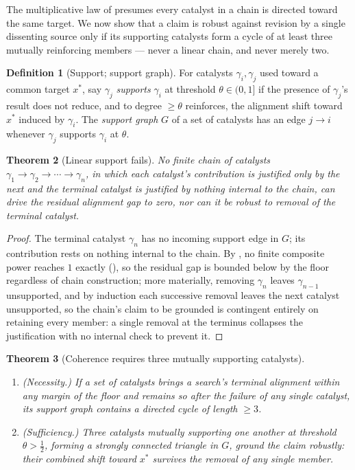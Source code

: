 \documentclass[11pt,twocolumn,a4paper]{article}
\theoremstyle{thmstyle}
\newtheorem{theorem}{Theorem}[section]
\theoremstyle{definition}
\newtheorem{definition}[theorem]{Definition}
\theoremstyle{remark}
\begin{document}
The multiplicative law of  presumes every
catalyst in a chain is directed toward the same target. We now show that a
claim is robust against revision by a single dissenting source only if its
supporting catalysts form a cycle of at least three mutually reinforcing
members --- never a linear chain, and never merely two.

\begin{definition}[Support; support graph]
\label{def:support}
For catalysts $\gamma_i,\gamma_j$ used toward a common target $x^{\ast}$,
say $\gamma_j$ \emph{supports} $\gamma_i$ at threshold $\theta\in(0,1]$ if
the presence of $\gamma_j$'s result does not reduce, and to degree
$\ge\theta$ reinforces, the alignment shift toward $x^{\ast}$ induced by
$\gamma_i$. The \emph{support graph} $G$ of a set of catalysts has an
edge $j\to i$ whenever $\gamma_j$ supports $\gamma_i$ at $\theta$.
\end{definition}

\begin{theorem}[Linear support fails]
\label{thm:linear-fails}
No finite chain of catalysts $\gamma_1\to\gamma_2\to\cdots\to\gamma_n$, in
which each catalyst's contribution is justified only by the next and the
terminal catalyst is justified by nothing internal to the chain, can drive
the residual alignment gap to zero, nor can it be robust to removal of the
terminal catalyst.
\end{theorem}

\begin{proof}
The terminal catalyst $\gamma_n$ has no incoming support edge in $G$; its
contribution rests on nothing internal to the chain. By
, no finite composite power reaches $1$ exactly
(), so the residual gap is bounded below by the
floor regardless of chain construction; more materially, removing
$\gamma_n$ leaves $\gamma_{n-1}$ unsupported, and by induction each
successive removal leaves the next catalyst unsupported, so the chain's
claim to be grounded is contingent entirely on retaining every member: a
single removal at the terminus collapses the justification with no
internal check to prevent it.
\end{proof}

\begin{theorem}[Coherence requires three mutually supporting catalysts]
\label{thm:triangle}
\leavevmode
\begin{enumerate}[label=\textup{(\roman*)},leftmargin=1.8em,itemsep=2pt]
\item \emph{(Necessity.)} If a set of catalysts brings a search's terminal
alignment within any margin of the floor and remains so after the failure
of any single catalyst, its support graph contains a directed cycle of
length $\ge3$.
\item \emph{(Sufficiency.)} Three catalysts mutually supporting one
another at threshold $\theta>\tfrac12$, forming a strongly connected
triangle in $G$, ground the claim robustly: their combined shift toward
$x^{\ast}$ survives the removal of any single member.
\end{enumerate}
\end{theorem}
\end{document}
